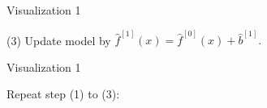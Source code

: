 \begin{vbframe}{Visualization 1}
\begin{footnotesize}
\vfill

(3) Update model by $\hat{f}^{[1]}(x) = \hat{f}^{[0]}(x) + \hat{b}^{[1]}.$
\end{footnotesize}

\end{vbframe}


\begin{frame}{Visualization 1}

\footnotesize
Repeat step (1) to (3):

\begin{center}

\end{center}
\end{frame}
